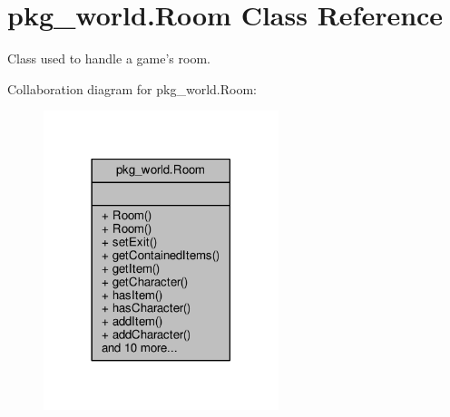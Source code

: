 \hypertarget{classpkg__world_1_1Room}{\section{pkg\-\_\-world.\-Room Class Reference}
\label{classpkg__world_1_1Room}
}


Class used to handle a game's room.  




Collaboration diagram for pkg\-\_\-world.\-Room\-:
\nopagebreak
\begin{figure}[H]
\begin{center}
\leavevmode
\includegraphics[width=194pt]{classpkg__world_1_1Room__coll__graph}
\end{center}
\end{figure}
